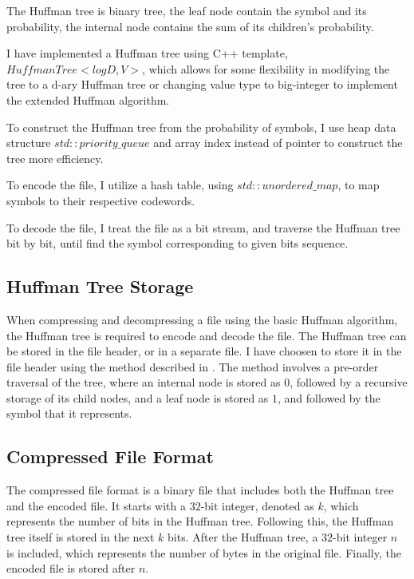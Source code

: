 \documentclass[a4paper,conference]{IEEEtran}
\begin{document}
The Huffman tree is binary tree, the leaf node contain the symbol and its probability, the internal node contains the sum of its children's probability.

I have implemented a Huffman tree using C++ template, $HuffmanTree<logD, V>$, which allows for some flexibility in modifying the tree to a d-ary Huffman tree or changing value type to big-integer to implement the extended Huffman algorithm.

To construct the Huffman tree from the probability of symbols, I use heap data structure $std::priority\_queue$ and array index instead of pointer to construct the tree more efficiency.

To encode the file, I utilize a hash table, using $std::unordered\_map$, to map symbols to their respective codewords.

To decode the file, I treat the file as a bit stream, and traverse the Huffman tree bit by bit, until find the symbol corresponding to given bits sequence.

\subsection{Huffman Tree Storage}

When compressing and decompressing a file using the basic Huffman algorithm, the Huffman tree is required to encode and decode the file. The Huffman tree can be stored in the file header, or in a separate file. I have choosen to store it in the file header using the method described in \cite{efficient-way-of-storing-Huffman-tree}. The method involves a pre-order traversal of the tree, where an internal node is stored as $0$, followed by a recursive storage of its child nodes, and a leaf node is stored as $1$, and followed by the symbol that it represents.

\subsection{Compressed File Format}

The compressed file format is a binary file that includes both the Huffman tree and the encoded file. It starts with a $32$-bit integer, denoted as $k$, which represents the number of bits in the Huffman tree. Following this, the Huffman tree itself is stored in the next $k$ bits. After the Huffman tree, a $32$-bit integer $n$ is included, which represents the number of bytes in the original file. Finally, the encoded file is stored after $n$.
\end{document}
